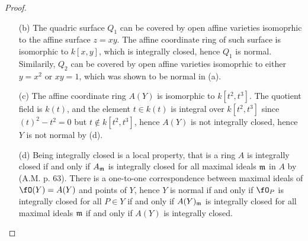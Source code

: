 \documentclass[a4paper]{article}
\begin{document}
\begin{enumerate} [label=\textbf{\arabic*.}, leftmargin=-0.05em]
\begin{proof}
\begin{itemize} [leftmargin=0cm]
    Now suppose $\Delta^2 = B^2 - 4AC \neq 0$ and assume $A \neq 0$, then we have
    \begin{equation*}
        f(x, y) = \bigg( \sqrt{A} x + \frac{B + \Delta}{2\sqrt{A}} y \bigg)  \bigg( \sqrt{A} x + \frac{B - \Delta}{2\sqrt{A}} y \bigg) + Dx + Ey + F,
    \end{equation*}
    so we can apply the affine transformation
    \begin{align*}
        \sqrt{A} x + \frac{B + \Delta}{2\sqrt{A}} y & \mapsto x \\
        \sqrt{A} x + \frac{B - \Delta}{2\sqrt{A}} y & \mapsto y
    \end{align*}
    which has determinant $1/\Delta \neq 0$, to obtain
    \begin{equation*}
        f'(x, y) = xy + (\text{linear terms}).
    \end{equation*}

    Since affine coordinate rings are invariant up to affine transformations, we have either $A(X) \simeq R$ or $A(X) \simeq S$.
    The ring $R = k[x, y] / (y - x^2)$ is isomorphic to a polynomial ring over one variable, which is a factorial, hence it is integrally closed. The ring $S = k[x, x^{-1}]$ is a discrete valuation ring, which are integrally closed by (A.M. p. 94).

    \item[(b)] The quadric surface $Q_1$ can be covered by open affine varieties isomoprhic to the affine surface $z = xy$.
    The affine coordinate ring of such surface is isomorphic to $k[x, y]$, which is integrally closed, hence $Q_1$ is normal.
    Similarily, $Q_2$ can be covered by open affine varieties isomoprhic to either $y = x^2$ or $xy = 1$, which was shown to be normal in (a).

    \item[(c)] The affine coordinate ring $A(Y)$ is isomorphic to $k[t^2, t^3]$. The quotient field is $k(t)$, and the element $t \in k(t)$ is integral over $k[t^2, t^3]$ since $(t)^2 - t^2 = 0$ but $t \notin k[t^2, t^3]$, hence $A(Y)$ is not integrally closed, hence $Y$ is not normal by (d).

    \item[(d)] Being integrally closed is a local property, that is a ring $A$ is integrally closed if and only if $A_{\mathfrak{m}}$ is integrally closed for all maximal ideals $\mathfrak{m}$ in $A$ by (A.M. p. 63). There is a one-to-one correspondence between maximal ideals of $\fO(Y) = A(Y)$ and points of $Y$, hence $Y$ is normal if and only if $\fO_P$ is integrally closed for all $P \in Y$ if and only if $A(Y)_{\mathfrak{m}}$ is integrally closed for all maximal ideals $\mathfrak{m}$ if and only if $A(Y)$ is integrally closed.


\end{itemize}
\end{proof}
\end{enumerate}
\end{document}
